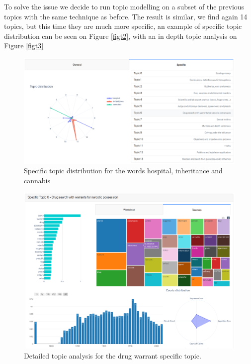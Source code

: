 To solve the issue we decide to run topic modelling on a subset of the previous 
topics with the same technique as before. The result is similar, we find again 14 topics, 
but this time they are much more specific, an example of specific topic distribution can be seen on Figure \vref{figt2}, with an in depth topic analysis on Figure \vref{figt3} 
\begin{figure}
  \begin{center}
    \includegraphics[width=\textwidth]{images/topic2.png}
    \caption{Specific topic distribution for the words hospital, inheritance and cannabis} \label{figt2}
  \end{center}
\end{figure}
\begin{figure}
  \begin{center}
    \includegraphics[width=\textwidth]{images/topic3.png}
    \caption{Detailed topic analysis for the drug warrant specific topic.} \label{figt3}
  \end{center}
\end{figure}

